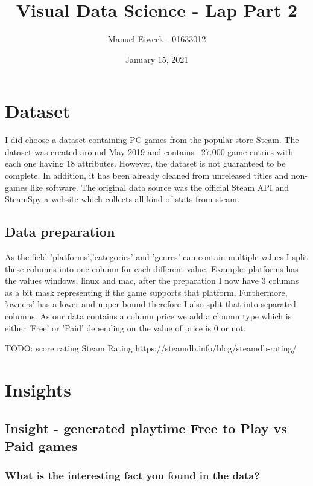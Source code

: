 \documentclass[11pt]{article}
\title{Visual Data Science - Lap Part 2}
\author{Manuel Eiweck - 01633012}
\date{January 15, 2021}
\begin{document}
\maketitle


\section{Dataset}

I did choose a dataset containing PC games from the popular store Steam. The dataset was created around May 2019 and contains ~27.000 game entries with each one having 18 attributes.
However, the dataset is not guaranteed to be complete. In addition, it has been already cleaned from unreleased titles and non-games like software. The original data source was the official Steam API and SteamSpy a website which collects all kind of stats from steam.

\subsection{Data preparation}

As the field 'platforms','categories' and 'genres' can contain multiple values I split these columns into one column for each different value. Example: platforms has the values windows, linux and mac, after the preparation I now have 3 columns as a bit mask representing if the game supports that platform. Furthermore, 'owners' has a lower and upper bound therefore I also split that into separated columns. As our data contains a column price we add a cloumn type which is either 'Free' or 'Paid' depending on the value of price is 0 or not.

TODO: score rating
Steam Rating
https://steamdb.info/blog/steamdb-rating/

\section{Insights}

\subsection{Insight - generated playtime Free to Play vs Paid games}

\subsubsection{What is the interesting fact you found in the data?}
\end{document}

